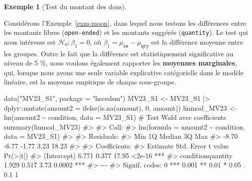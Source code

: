 \documentclass[
  11pt,
  letterpaper,
]{scrbook}
\newenvironment{Shaded}{\begin{snugshade}}{\end{snugshade}}
\newcommand{\AttributeTok}[1]{\textcolor[rgb]{0.40,0.45,0.13}{#1}}
\newcommand{\CommentTok}[1]{\textcolor[rgb]{0.37,0.37,0.37}{#1}}
\newcommand{\DecValTok}[1]{\textcolor[rgb]{0.68,0.00,0.00}{#1}}
\newcommand{\FunctionTok}[1]{\textcolor[rgb]{0.28,0.35,0.67}{#1}}
\newcommand{\NormalTok}[1]{\textcolor[rgb]{0.00,0.23,0.31}{#1}}
\newcommand{\OtherTok}[1]{\textcolor[rgb]{0.00,0.23,0.31}{#1}}
\newcommand{\SpecialCharTok}[1]{\textcolor[rgb]{0.37,0.37,0.37}{#1}}
\newcommand{\StringTok}[1]{\textcolor[rgb]{0.13,0.47,0.30}{#1}}
\theoremstyle{definition}
\newtheorem{example}{Exemple}[chapter]
\theoremstyle{definition}
\theoremstyle{plain}
\theoremstyle{plain}
\theoremstyle{remark}
\begin{document}
\begin{example}[Test du montant des
dons]\protect\hypertarget{exm-moonvaepps-test}{}\label{exm-moonvaepps-test}

Considérons l'Exemple~\ref{exm-moon}, dans lequel nous testons les
différences entre les montants libres (\texttt{open-ended}) et les
montants suggérés (\texttt{quantity}). Le test qui nous intéresse est
\(\mathscr{H}_0 : \beta_1=0\), où
\(\beta_1=\mu_{\texttt{oe}} - \mu_{\texttt{qty}}\) est la différence
moyenne entre les groupes. Outre le fait que la différence est
statistiquement significative au niveau de 5 \%, nous voulons également
rapporter les \textbf{moyennes marginales}, qui, lorsque nous avons une
seule variable explicative catégorielle dans le modèle linéaire, est la
moyenne empirique de chaque sous-groupe.

\begin{Shaded}
\begin{Highlighting}[]
\FunctionTok{data}\NormalTok{(}\StringTok{"MV23\_S1"}\NormalTok{, }\AttributeTok{package =} \StringTok{"hecedsm"}\NormalTok{)}
\NormalTok{MV23\_S1 }\OtherTok{\textless{}{-}}\NormalTok{ MV23\_S1 }\SpecialCharTok{|\textgreater{}}
\NormalTok{    dplyr}\SpecialCharTok{::}\FunctionTok{mutate}\NormalTok{(}\AttributeTok{amount2 =} \FunctionTok{ifelse}\NormalTok{(}\FunctionTok{is.na}\NormalTok{(amount), }\DecValTok{0}\NormalTok{, amount))}
\NormalTok{linmod\_MV23 }\OtherTok{\textless{}{-}} \FunctionTok{lm}\NormalTok{(amount2 }\SpecialCharTok{\textasciitilde{}}\NormalTok{ condition, }\AttributeTok{data =}\NormalTok{ MV23\_S1)}
\CommentTok{\# Test Wald avec coefficients}
\FunctionTok{summary}\NormalTok{(linmod\_MV23)}
\CommentTok{\#\textgreater{} }
\CommentTok{\#\textgreater{} Call:}
\CommentTok{\#\textgreater{} lm(formula = amount2 \textasciitilde{} condition, data = MV23\_S1)}
\CommentTok{\#\textgreater{} }
\CommentTok{\#\textgreater{} Residuals:}
\CommentTok{\#\textgreater{}    Min     1Q Median     3Q    Max }
\CommentTok{\#\textgreater{}  {-}8.70  {-}6.77  {-}1.77   3.23  18.23 }
\CommentTok{\#\textgreater{} }
\CommentTok{\#\textgreater{} Coefficients:}
\CommentTok{\#\textgreater{}                   Estimate Std. Error t value Pr(\textgreater{}|t|)    }
\CommentTok{\#\textgreater{} (Intercept)          6.771      0.377   17.95   \textless{}2e{-}16 ***}
\CommentTok{\#\textgreater{} conditionquantity    1.929      0.517    3.73   0.0002 ***}
\CommentTok{\#\textgreater{} {-}{-}{-}}
\CommentTok{\#\textgreater{} Signif. codes:  0 \textquotesingle{}***\textquotesingle{} 0.001 \textquotesingle{}**\textquotesingle{} 0.01 \textquotesingle{}*\textquotesingle{} 0.05 \textquotesingle{}.\textquotesingle{} 0.1 \textquotesingle{} \textquotesingle{} 1}

\end{Highlighting}
\end{Shaded}
\end{example}
\end{document}
